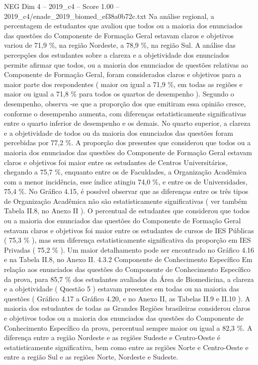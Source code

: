 \begin{textsample}{NEG Dim 4 – 2019\_c4 – Score 1.00 – 2019\_c4/enade\_2019\_biomed\_ef38a0b72c.txt}
Na análise regional, a percentagem de estudantes que avaliou que todos ou a maioria dos enunciados das questões do Componente de Formação Geral estavam claros e objetivos variou de 71,9 \%, na região Nordeste, a 78,9 \%, na região Sul.
A análise das percepções dos estudantes sobre a clareza e a objetividade dos enunciados permite afirmar que todos, ou a maioria dos enunciados de questões relativas ao Componente de Formação Geral, foram considerados claros e objetivos para a maior parte dos respondentes ( maior ou igual a 71,9 \%, em todas as regiões e maior ou igual a 71,8 \% para todos os quartos de desempenho ).
Segundo o desempenho, observa -se que a proporção dos que emitiram essa opinião cresce, conforme o desempenho aumenta, com diferenças estatisticamente significativas entre o quarto inferior de desempenho e os demais.
No quarto superior, a clareza e a objetividade de todos ou da maioria dos enunciados das questões foram percebidas por 77,2 \%.
A proporção dos presentes que considerou que todos ou a maioria dos enunciados das questões do Componente de Formação Geral estavam claros e objetivos foi maior entre os estudantes de Centros Universitários, chegando a 75,7 \%, enquanto entre os de Faculdades, a Organização Acadêmica com a menor incidência, esse índice atingiu 74,0 \%, e entre os de Universidades, 75,4 \%.
No Gráfico 4.15, é possível observar que as diferenças entre os três tipos de Organização Acadêmica não são estatisticamente significativas ( ver também Tabela II.8, no Anexo II ).
O percentual de estudantes que considerou que todos ou a maioria dos enunciados das questões do Componente de Formação Geral estavam claros e objetivos foi maior entre os estudantes de cursos de IES Públicas ( 75,3 \% ), mas sem diferença estatisticamente significativa da proporção em IES Privadas ( 75,2 \% ).
Um maior detalhamento pode ser encontrado no Gráfico 4.16 e na Tabela II.8, no Anexo II. 4.3.2 Componente de Conhecimento Específico Em relação aos enunciados das questões do Componente de Conhecimento Específico da prova, para 85,7 \% dos estudantes avaliados da Área de Biomedicina, a clareza e a objetividade ( Questão 5 ) estavam presentes em todas ou na maioria das questões ( Gráfico 4.17 a Gráfico 4.20, e no Anexo II, as Tabelas II.9 e II.10 ).
A maioria dos estudantes de todas as Grandes Regiões brasileiras considerou claros e objetivos todos ou a maioria dos enunciados das questões do Componente de Conhecimento Específico da prova, percentual sempre maior ou igual a 82,3 \%.
A diferença entre a região Nordeste e as regiões Sudeste e Centro-Oeste é estatisticamente significativa, bem como entre as regiões Norte e Centro-Oeste e entre a região Sul e as regiões Norte, Nordeste e Sudeste.

\end{textsample}
